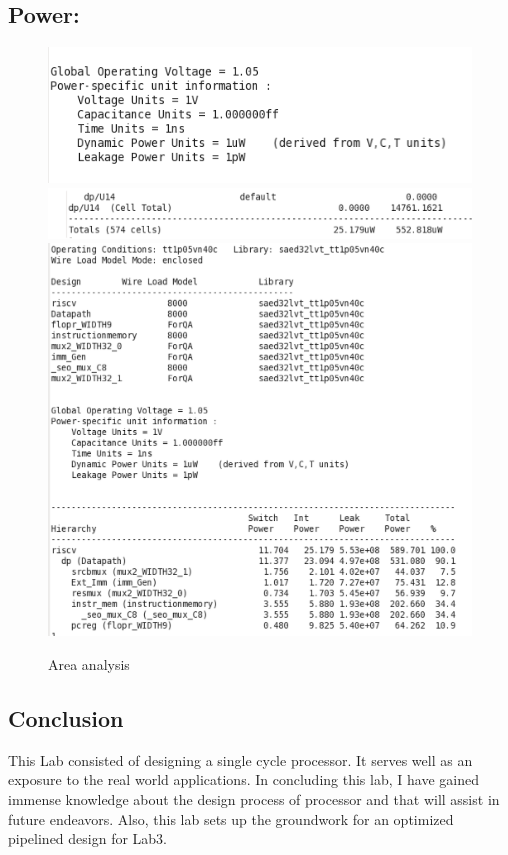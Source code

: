\documentclass[20pt]{article}
\begin{document}
\subsection{Power:}

\begin{figure}[H]
	\includegraphics[width=\linewidth]{Power1}
	\linebreak
	\includegraphics[width=\linewidth]{Powerf}
	\includegraphics[width=\linewidth]{PowerHier}
	\caption{Area analysis }
\end{figure}

\subsection{Conclusion}
This Lab consisted of designing a single cycle processor. It serves well as an exposure to the real world applications. In concluding this lab, I have gained immense knowledge about the design process of processor and that will assist in future endeavors. Also, this lab sets up the groundwork for an optimized pipelined design for Lab3. 
\end{document}
